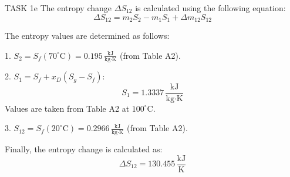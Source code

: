 TASK 1e  
The entropy change \( \Delta S_{12} \) is calculated using the following equation:  
\[
\Delta S_{12} = m_2 S_2 - m_1 S_1 + \Delta m_{12} S_{12}
\]

The entropy values are determined as follows:  

1. \( S_2 = S_f(70^\circ\text{C}) = 0.195 \, \frac{\text{kJ}}{\text{kg·K}} \) (from Table A2).  

2. \( S_1 = S_f + x_D(S_g - S_f) \):  
   \[
   S_1 = 1.3337 \, \frac{\text{kJ}}{\text{kg·K}}
   \]  
   Values are taken from Table A2 at \( 100^\circ\text{C} \).  

3. \( S_{12} = S_f(20^\circ\text{C}) = 0.2966 \, \frac{\text{kJ}}{\text{kg·K}} \) (from Table A2).  

Finally, the entropy change is calculated as:  
\[
\Delta S_{12} = 130.455 \, \frac{\text{kJ}}{\text{K}}
\]